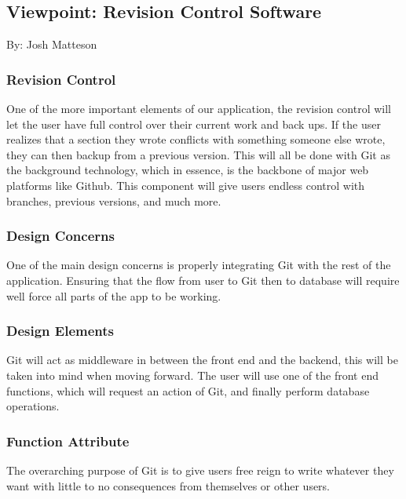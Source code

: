 \documentclass[letterpaper, 10pt, draftclsnofoot, compsoc, onecolumn]{IEEEtran}
\begin{document}
\newpage
\subsection{Viewpoint: Revision Control Software}
{\noindent By: Josh Matteson \par}

\subsubsection{Revision Control}
{\noindent One of the more important elements of our application, the revision control will let the user have full control 
over their current work and back ups. If the user realizes that a section they wrote conflicts with something someone else wrote, 
they can then backup from a previous version. This will all be done with Git as the background technology, which in essence, is 
the backbone of major web platforms like Github. This component will give users endless control with branches, previous versions,
and much more. \par}

\subsubsection{Design Concerns}
{\noindent One of the main design concerns is properly integrating Git with the rest of the application. 
Ensuring that the flow from user to Git then to database will require well force all parts of the app to be working.
 \par}

\subsubsection{Design Elements}
{\noindent Git will act as middleware in between the front end and the backend, this will be taken into mind when moving forward. 
The user will use one of the front end functions, which will request an action of Git, and finally perform database operations. \par}

\subsubsection{Function Attribute}
{\noindent The overarching purpose of Git is to give users free reign to write whatever they want with little to no consequences 
from themselves or other users. \par}
\end{document}
